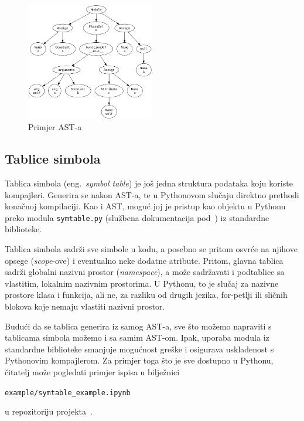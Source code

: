 \begin{figure}[hb]
    \label{fig:ast-example}
    \centering
    \includegraphics[width=0.5\textwidth]{assets/ast-example.png}
    \caption{Primjer AST-a}
\end{figure}

\subsection{Tablice simbola}
Tablica simbola (eng.\ \textsl{symbol table}) je još jedna struktura podataka koju koriste kompajleri. Generira se nakon AST-a, te u Pythonovom slučaju direktno prethodi konačnoj kompilaciji. Kao i AST, moguć joj
je pristup kao objektu u Pythonu preko modula \texttt{symtable.py} (službena dokumentacija pod~\cite{docs:symtable}) iz standardne biblioteke. 

Tablica simbola sadrži sve simbole u kodu, a posebno se pritom osvrće na njihove opsege (\emph{scope}-ove) i eventualno neke dodatne atribute. Pritom, glavna tablica sadrži globalni nazivni prostor (\emph{namespace}), 
a može sadržavati i podtablice sa vlastitim, lokalnim nazivnim prostorima. U Pythonu, to je slučaj za nazivne prostore klasa i funkcija, ali ne, za razliku od drugih jezika, for-petlji ili sličnih blokova koje nemaju vlastiti 
nazivni prostor.

Budući da se tablica generira iz samog AST-a, sve što možemo napraviti s tablicama simbola možemo i sa samim AST-om. Ipak, uporaba modula iz standardne biblioteke smanjuje mogućnost greške i osigurava usklađenost s
Pythonovim kompajlerom. Za primjer toga što je sve dostupno u Pythonu, čitatelj može pogledati primjer ispisa u bilježnici
\begin{center}
\texttt{example/symtable_example.ipynb}
\end{center}
u repozitoriju projekta~\cite{repo}.

